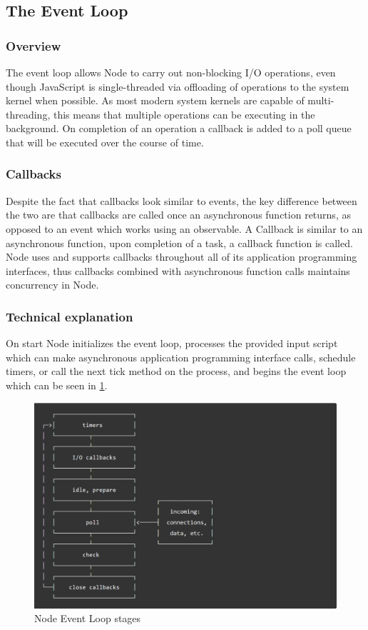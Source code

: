 \subsection{The Event Loop}
	\subsubsection{Overview}
    	The event loop allows Node to carry out non-blocking I/O operations, even though JavaScript is single-threaded via offloading of operations to the system kernel when possible\cite{node}. As most modern system kernels are capable of multi-threading, this means that multiple operations can be executing in the background. On completion of an operation a callback is added to a poll queue that will be executed over the course of time\cite{node}. 
    \subsubsection{Callbacks}
    Despite the fact that callbacks look similar to events, the key difference between the two are that callbacks are called once an asynchronous function returns, as opposed to an event which works using an observable. A Callback is similar to an asynchronous function, upon completion of a task, a callback function is called. Node uses and supports callbacks throughout all of its application programming interfaces, thus callbacks combined with asynchronous function calls maintains concurrency in Node. 
    \subsubsection{Technical explanation}
   On start Node initializes the event loop, processes the provided input script which can make asynchronous application programming interface calls, schedule timers, or call the next tick method on the process, and begins the event loop which can be seen in \ref{fig:eventLoop}. 
\begin{figure}
\includegraphics[width=\textwidth]{img/eventLoop.PNG}
\caption{Node Event Loop stages}
\label{fig:eventLoop}
\end{figure}

